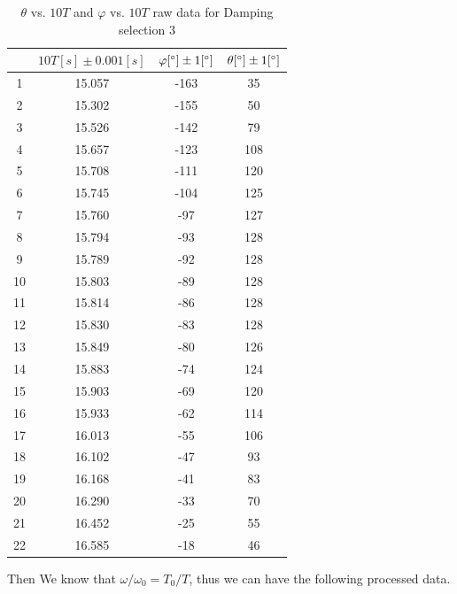 \begin{table}[H]
\centering
\begin{tabular}{|c|c|c|c|}
\hline
& $10T [s] \pm 0.001 [s]$ &  $\varphi  [^\circ]  \pm 1 [^\circ]$ & $ \theta [^\circ] \pm 1 [^\circ]$ \\ \hline

1  & 15.057   & -163 &  35   \\ \hline
2  & 15.302   & -155 &  50   \\ \hline
3  & 15.526   & -142 &  79   \\ \hline
4  & 15.657   & -123 &  108  \\ \hline
5  & 15.708   & -111 &  120  \\ \hline
6  & 15.745   & -104 &  125  \\ \hline
7  & 15.760   & -97  &  127  \\ \hline
8  & 15.794   & -93  &  128  \\ \hline
9  & 15.789   & -92  &  128  \\ \hline
10 & 15.803   & -89  &  128  \\ \hline
11 & 15.814   & -86  &  128  \\ \hline
12 & 15.830   & -83  &  128  \\ \hline
13 & 15.849   & -80  &  126  \\ \hline
14 & 15.883   & -74  &  124  \\ \hline
15 & 15.903   & -69  &  120  \\ \hline
16 & 15.933   & -62  &  114  \\ \hline
17 & 16.013   & -55  &  106  \\ \hline
18 & 16.102   & -47  &  93   \\ \hline
19 & 16.168   & -41  &  83   \\ \hline
20 & 16.290   & -33  &  70   \\ \hline
21 & 16.452   & -25  &  55   \\ \hline
22 & 16.585   & -18  &  46   \\ \hline
\end{tabular}    
\caption{$\theta$ vs. $10T$ and $\varphi$ vs. $10T$ raw data for Damping selection 3}
\end{table}


Then We know that $ \omega / \omega_0 = T_0 / T $,
thus we can have the following processed data.


